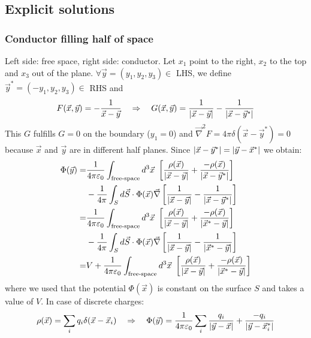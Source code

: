 \subsection{Explicit solutions}

\subsubsection{Conductor filling half of space}

Left side: free space, right side: conductor. Let $x_1$ point to the right,
$x_2$ to the top and $x_3$ out of the plane. $\forall \vec{y} = (y_1,y_2,y_3)
\in$ LHS, we define $\vec{y}^\ast = (-y_1,y_2,y_3) \in$ RHS and
\begin{align*}
    F(\vec{x},\vec{y}) = - \frac{1}{\vec{x} - \vec{y}}
    \hspace{10pt} \Rightarrow \hspace{10pt}
    G(\vec{x},\vec{y}) = \frac{1}{\left\vert \vec{x} - \vec{y} \right\vert} -
        \frac{1}{\left\vert \vec{x} - \vec{y}^\ast \right\vert}
\end{align*}
This $G$ fulfills $G = 0$ on the boundary ($y_1 = 0$) and $\vec{\nabla}^2 F
= 4 \pi \delta(\vec{x} - \vec{y}^\ast) = 0$ because $\vec{x}$ and $\vec{y}$
are in different half planes. Since $\left\vert \vec{x} - \vec{y}^\ast \right\vert =
\left\vert \vec{y} - \vec{x}^\ast \right\vert$ we obtain:
\begin{align*}
    \Phi(\vec{y}) = &\frac{1}{4 \pi \epsilonnull} \int_{\text{free-space}} d^3 \vec{x} \ \eckigeklammer{\frac{\rho(\vec{x})}{\abs{\vec{x} - \vec{y}}} + \frac{-\rho(\vec{x})}{\abs{\vec{x} - \vec{y}^\ast}} }
        \\
        &- \frac{1}{4 \pi} \int_S d \vec{S} \cdot \Phi(\vec{x}) \vec{\nabla} \eckigeklammer{\frac{1}{\abs{\vec{x} - \vec{y}}} - \frac{1}{\abs{\vec{x} - \vec{y}^\ast}}}
        \\
        = &\frac{1}{4 \pi \epsilonnull} \int_{\text{free-space}} d^3 \vec{x} \ \eckigeklammer{\frac{\rho(\vec{x})}{\abs{\vec{x} - \vec{y}}} + \frac{-\rho(\vec{x})}{\abs{\vec{x}^\ast - \vec{y}}}}
        \\
        &- \frac{1}{4 \pi} \int_S d \vec{S} \cdot \Phi(\vec{x}) \vec{\nabla} \eckigeklammer{\frac{1}{\abs{\vec{x} - \vec{y}}} - \frac{1}{\abs{\vec{x}^\ast - \vec{y}}}}
        \\
        = &V + \frac{1}{4 \pi \epsilonnull} \int_{\text{free-space}} d^3 \vec{x} \ \eckigeklammer{\frac{\rho(\vec{x})}{\abs{\vec{x} - \vec{y}}} + \frac{-\rho(\vec{x})}{\abs{\vec{x}^\ast - \vec{y}}}}
\end{align*}
where we used that the potential $\Phi(\vec{x})$ is constant on the surface
$S$ and takes a value of $V$. In case of discrete charges:
\begin{align*}
    \rho(\vec{x}) = \sum_i q_i \delta(\vec{x} - \vec{x}_i)
    \hspace{10pt} \Rightarrow \hspace{10pt}
    \Phi(\vec{y}) = \frac{1}{4 \pi \varepsilon_0} \sum_i \frac{q_i}{\left\vert \vec{y} - \vec{x} \right\vert} + \frac{-q_i}{\left\vert \vec{y} - \vec{x}_i^\ast \right\vert}
\end{align*}

